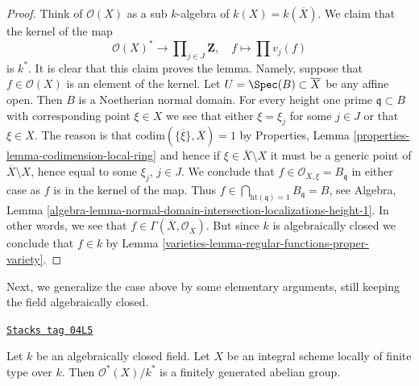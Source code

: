 \begin{proof}
\medskip\noindent
Think of $\mathcal{O}(X)$ as a sub $k$-algebra of $k(X) = k(\overline{X})$.
We claim that the kernel of the map
$$
\mathcal{O}(X)^* \longrightarrow
\prod\nolimits_{j \in J} \mathbf{Z},
\quad
f \longmapsto \prod v_j(f)
$$
is $k^*$. It is clear that this claim proves the lemma.
Namely, suppose that $f \in \mathcal{O}(X)$ is an element of the kernel.
Let $U = \Spec(B) \subset \overline{X}$ be any affine open.
Then $B$ is a Noetherian normal domain.
For every height one prime $\mathfrak q \subset B$ with corresponding
point $\xi \in X$ we see that either $\xi = \xi_j$ for some $j \in J$
or that $\xi \in X$. The reason is that
$\text{codim}(\overline{\{\xi\}}, \overline{X}) = 1$ by
Properties, Lemma \ref{properties-lemma-codimension-local-ring}
and hence if $\xi \in \overline{X} \setminus X$ it must be a
generic point of $\overline{X} \setminus X$, hence equal to some
$\xi_j$, $j \in J$.
We conclude that $f \in \mathcal{O}_{X, \xi} = B_{\mathfrak q}$
in either case as $f$ is in the kernel of the map. Thus
$f \in \bigcap_{\text{ht}(\mathfrak q) = 1} B_{\mathfrak q} = B$, see
Algebra, Lemma
\ref{algebra-lemma-normal-domain-intersection-localizations-height-1}.
In other words, we see that
$f \in \Gamma(\overline{X}, \mathcal{O}_{\overline{X}})$.
But since $k$ is algebraically closed we conclude that
$f \in k$ by
Lemma \ref{varieties-lemma-regular-functions-proper-variety}.
\end{proof}

Next, we generalize the case above by some elementary arguments, still
keeping the field algebraically closed.

\begin{lemma}
\label{varieties-lemma-units-integral-finite-type-algebraically-closed}
\href{https://stacks.math.columbia.edu/tag/04L5}{\texttt{Stacks tag 04L5}}

Let $k$ be an algebraically closed field.
Let $X$ be an integral scheme locally of finite type over $k$.
Then $\mathcal{O}^*(X)/k^*$ is a finitely generated abelian group.
\end{lemma}

